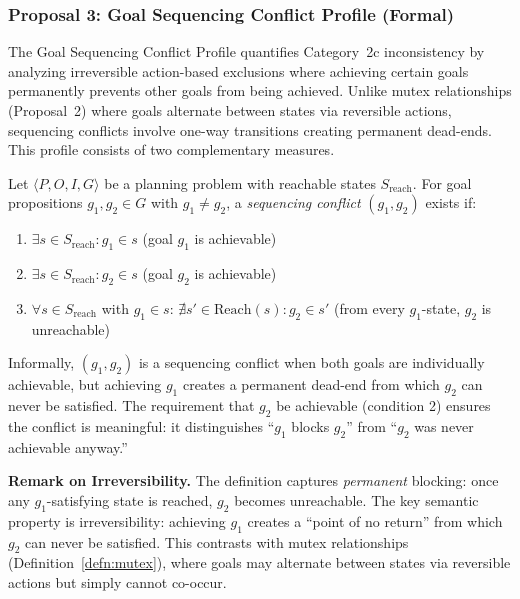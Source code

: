 \subsubsection{Proposal 3: Goal Sequencing Conflict Profile (Formal)}

The Goal Sequencing Conflict Profile quantifies Category~2c inconsistency by analyzing irreversible action-based exclusions where achieving certain goals permanently prevents other goals from being achieved. Unlike mutex relationships (Proposal~2) where goals alternate between states via reversible actions, sequencing conflicts involve one-way transitions creating permanent dead-ends. This profile consists of two complementary measures.

\begin{defn}
    \label{defn:sequencing}
    Let $\langle P, O, I, G \rangle$ be a planning problem with reachable states $S_{\text{reach}}$. For goal propositions $g_1, g_2 \in G$ with $g_1 \neq g_2$, a \emph{sequencing conflict} $(g_1, g_2)$ exists if:
    \begin{enumerate}
        \item $\exists s \in S_{\text{reach}} : g_1 \in s$ (goal $g_1$ is achievable)
        \item $\exists s \in S_{\text{reach}} : g_2 \in s$ (goal $g_2$ is achievable)
        \item $\forall s \in S_{\text{reach}}$ with $g_1 \in s$:
              $\nexists s' \in \text{Reach}(s) : g_2 \in s'$ (from every $g_1$-state,
              $g_2$ is unreachable)
    \end{enumerate}
\end{defn}

Informally, $(g_1, g_2)$ is a sequencing conflict when both goals are individually achievable, but achieving $g_1$ creates a permanent dead-end from which $g_2$ can never be satisfied. The requirement that $g_2$ be achievable (condition 2) ensures the conflict is meaningful: it distinguishes ``$g_1$ blocks $g_2$'' from ``$g_2$ was never achievable anyway.''

\textbf{Remark on Irreversibility.} The definition captures \emph{permanent} blocking: once any $g_1$-satisfying state is reached, $g_2$ becomes unreachable. The key semantic property is irreversibility: achieving $g_1$ creates a ``point of no return'' from which $g_2$ can never be satisfied. This contrasts with mutex relationships (Definition~\ref{defn:mutex}), where goals may alternate between states via reversible actions but simply cannot co-occur.

